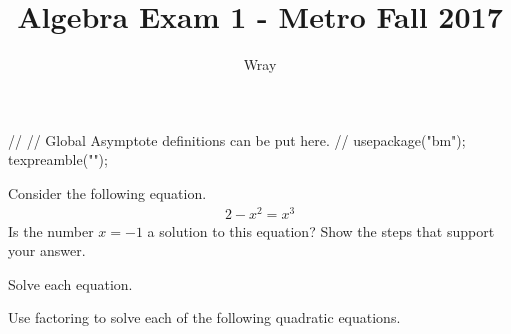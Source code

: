 \documentclass[addpoints, 12pt]{exam}
\title{Algebra Exam 1 - Metro Fall 2017}
\author{Wray}
\begin{document}
\begin{asydef}
//
// Global Asymptote definitions can be put here.
//
usepackage("bm");
texpreamble("\def\V#1{\bm{#1}}");
\end{asydef}

\bigskip

             
\bigskip

\begin{questions}

\question[2]
Consider the following equation.
\begin{align*}
2 - x^2 = x^3  
\end{align*}
Is the number $x = -1$ a solution to this equation?  Show the steps that support your answer.


\question[8]
Solve each equation.


\clearpage

\question[11]
Use factoring to solve each of the following quadratic equations.

\end{questions}
\end{document}
